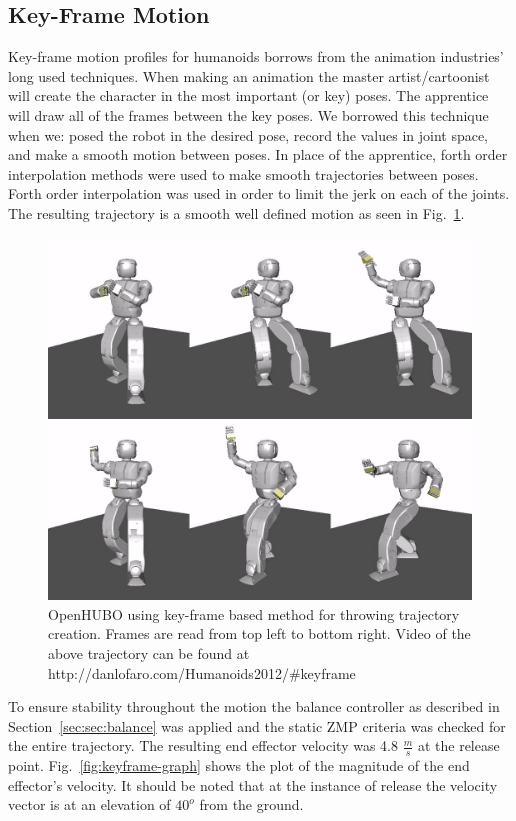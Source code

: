 \subsection{Key-Frame Motion}\label{sec:sec:keyframe}

Key-frame motion profiles for humanoids borrows from the animation industries' long used techniques.  
When making an animation the master artist/cartoonist will create the character in the most important (or key) poses.  
The apprentice will draw all of the frames between the key poses.  
We borrowed this technique when we: posed the robot in the desired pose, record the values in joint space, and make a smooth motion between poses.  
In place of the apprentice, forth order interpolation methods were used to make smooth trajectories between poses.  
Forth order interpolation was used in order to limit the jerk on each of the joints.  
The resulting trajectory is a smooth well defined motion as seen in Fig.~\ref{fig:keyframe-throw}.

\begin{figure}[t]
  \centering
\includegraphics[width=1.0\columnwidth]{./pix/keyframe/keyframe.png}
  \caption{OpenHUBO using key-frame based method for throwing trajectory creation.  Frames are read from top left to bottom right.  Video of the above trajectory can be found at http://danlofaro.com/Humanoids2012/\#keyframe}
  \label{fig:keyframe-throw}
\end{figure}

To ensure stability throughout the motion the balance controller as described in Section~\ref{sec:sec:balance} was applied and the static ZMP criteria was checked for the entire trajectory.
The resulting end effector velocity was 4.8 $\frac{m}{s}$ at the release point.  
Fig.~\ref{fig:keyframe-graph} shows the plot of the magnitude of the end effector's velocity.  
It should be noted that at the instance of release the velocity vector is at an elevation of $40^o$ from the ground.

